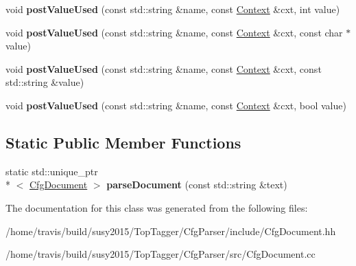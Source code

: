 \begin{DoxyCompactItemize}
\item 
\hypertarget{classcfg_1_1CfgDocument_a79a2e32dd17ee0a44b3edb6c4b93ed4d}{void {\bfseries post\-Value\-Used} (const std\-::string \&name, const \hyperlink{classcfg_1_1Context}{Context} \&cxt, int value)}\label{classcfg_1_1CfgDocument_a79a2e32dd17ee0a44b3edb6c4b93ed4d}

\item 
\hypertarget{classcfg_1_1CfgDocument_ad49d863f75f92db5d3f0d382b4c56380}{void {\bfseries post\-Value\-Used} (const std\-::string \&name, const \hyperlink{classcfg_1_1Context}{Context} \&cxt, const char $\ast$value)}\label{classcfg_1_1CfgDocument_ad49d863f75f92db5d3f0d382b4c56380}

\item 
\hypertarget{classcfg_1_1CfgDocument_a6339d992b1356deb95bd6493ed76f279}{void {\bfseries post\-Value\-Used} (const std\-::string \&name, const \hyperlink{classcfg_1_1Context}{Context} \&cxt, const std\-::string \&value)}\label{classcfg_1_1CfgDocument_a6339d992b1356deb95bd6493ed76f279}

\item 
\hypertarget{classcfg_1_1CfgDocument_ae53be6f4f805749868bb734f1c8c700c}{void {\bfseries post\-Value\-Used} (const std\-::string \&name, const \hyperlink{classcfg_1_1Context}{Context} \&cxt, bool value)}\label{classcfg_1_1CfgDocument_ae53be6f4f805749868bb734f1c8c700c}

\end{DoxyCompactItemize}
\subsection*{Static Public Member Functions}
\begin{DoxyCompactItemize}
\item 
\hypertarget{classcfg_1_1CfgDocument_a5124097991f411053eb8dab6b9057dbe}{static std\-::unique\-\_\-ptr\\*
$<$ \hyperlink{classcfg_1_1CfgDocument}{Cfg\-Document} $>$ {\bfseries parse\-Document} (const std\-::string \&text)}\label{classcfg_1_1CfgDocument_a5124097991f411053eb8dab6b9057dbe}

\end{DoxyCompactItemize}


The documentation for this class was generated from the following files\-:\begin{DoxyCompactItemize}
\item 
/home/travis/build/susy2015/\-Top\-Tagger/\-Cfg\-Parser/include/Cfg\-Document.\-hh\item 
/home/travis/build/susy2015/\-Top\-Tagger/\-Cfg\-Parser/src/Cfg\-Document.\-cc\end{DoxyCompactItemize}

